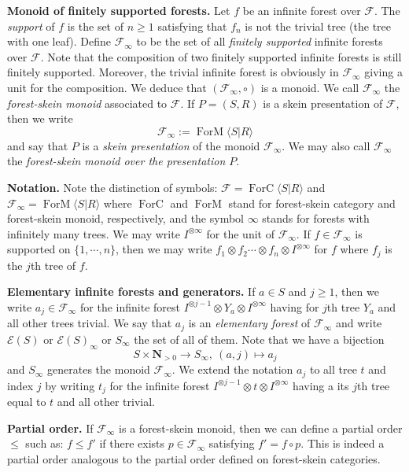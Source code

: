 \documentclass[a4paper, 12pt]{amsart}
\numberwithin{equation}{section}
\theoremstyle{definition}
\newcommand{\cE}{\mathcal E}
\newcommand{\cF}{\mathcal F}
\DeclareMathOperator{\FC}{ForC}
\DeclareMathOperator{\FM}{ForM}
\newcommand{\N}{\mathbf{N}}
\newcommand{\ot}{\otimes}
\begin{document}
{\bf Monoid of finitely supported forests.}
Let $f$ be an infinite forest over $\cF$.
The {\it support} of $f$ is the set of $n\geq 1$ satisfying that $f_n$ is not the trivial tree (the tree with one leaf).
Define $\cF_\infty$ to be the set of all {\it finitely supported} infinite forests over $\cF$.
Note that the composition of two finitely supported infinite forests is still finitely supported. 
Moreover, the trivial infinite forest is obviously in $\cF_\infty$ giving a unit for the composition.
We deduce that $(\cF_\infty,\circ)$ is a monoid.
We call $\cF_\infty$ the \textit{forest-skein monoid} associated to $\cF$.
If $P=(S,R)$ is a skein presentation of $\cF$, then we write 
$$\cF_\infty:=\FM\langle S| R\rangle$$
and say that $P$ is a {\it skein presentation} of the monoid $\cF_\infty$.
We may also call $\cF_\infty$ the \textit{forest-skein monoid over the presentation $P$}.

{\bf Notation.}
Note the distinction of symbols: $\cF=\FC\langle S|  R\rangle$ and $\cF_\infty=\FM\langle S|  R\rangle$ where $\FC$ and $\FM$ stand for forest-skein category and forest-skein monoid, respectively, and the symbol $\infty$ stands for forests with infinitely many trees.
We may write $I^{\ot\infty}$ for the unit of $\cF_\infty$.
If $f\in\cF_\infty$ is supported on $\{1,\cdots,n\}$, then we may write $f_1\ot f_2\cdots \ot f_n\ot I^{\ot \infty}$ for $f$ where $f_j$ is the $j$th tree of $f$. 

{\bf Elementary infinite forests and generators.}
If $a\in S$ and $j\geq 1$, then we write $a_j\in \cF_\infty$ for the infinite forest $I^{\ot j-1}\ot Y_a\ot I^{\ot \infty}$ having for $j$th tree $Y_a$ and all other trees trivial.
We say that $a_j$ is an \textit{elementary forest} of $\cF_\infty$ and write $\cE(S)$ or $\cE(S)_\infty$ or $S_\infty$ the set of all of them.
Note that we have a bijection
$$S\times \N_{>0}\to S_\infty, \ (a,j)\mapsto a_j$$
and $S_\infty$ generates the monoid $\cF_\infty$.
We extend the notation $a_j$ to all tree $t$ and index $j$ by writing $t_j$ for the infinite forest $I^{\ot j-1}\ot t\ot I^{\ot \infty}$ having a its $j$th tree equal to $t$ and all other trivial.

{\bf Partial order.}
If $\cF_\infty$ is a forest-skein monoid, then we can define a partial order $\leq$ such as:
$f\leq f'$ if there exists $p\in \cF_\infty$ satisfying $f'=f\circ p$.
This is indeed a partial order analogous to the partial order defined on forest-skein categories.
\end{document}
